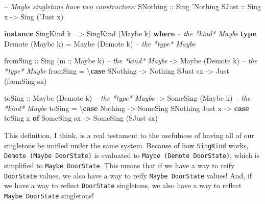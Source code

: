 \documentclass[]{article}
\newenvironment{Shaded}{}{}
\newcommand{\CharTok}[1]{\textcolor[rgb]{0.25,0.44,0.63}{#1}}
\newcommand{\CommentTok}[1]{\textcolor[rgb]{0.38,0.63,0.69}{\textit{#1}}}
\newcommand{\DataTypeTok}[1]{\textcolor[rgb]{0.56,0.13,0.00}{#1}}
\newcommand{\FunctionTok}[1]{\textcolor[rgb]{0.02,0.16,0.49}{#1}}
\newcommand{\KeywordTok}[1]{\textcolor[rgb]{0.00,0.44,0.13}{\textbf{#1}}}
\newcommand{\NormalTok}[1]{#1}
\newcommand{\OtherTok}[1]{\textcolor[rgb]{0.00,0.44,0.13}{#1}}
\begin{document}
\begin{Shaded}
\begin{Highlighting}[]
\CommentTok{-- Maybe singletons have two constructors:}
\DataTypeTok{SNothing}\OtherTok{ ::} \DataTypeTok{Sing} \CharTok{'Nothing}
\DataTypeTok{SJust}\OtherTok{    ::} \DataTypeTok{Sing}\NormalTok{ x }\OtherTok{->} \DataTypeTok{Sing}\NormalTok{ (}\CharTok{'Just x)}

\KeywordTok{instance} \DataTypeTok{SingKind}\NormalTok{ k }\OtherTok{=>} \DataTypeTok{SingKind}\NormalTok{ (}\DataTypeTok{Maybe}\NormalTok{ k) }\KeywordTok{where}     \CommentTok{-- the *kind* Maybe}
    \KeywordTok{type} \DataTypeTok{Demote}\NormalTok{ (}\DataTypeTok{Maybe}\NormalTok{ k) }\FunctionTok{=} \DataTypeTok{Maybe}\NormalTok{ (}\DataTypeTok{Demote}\NormalTok{ k)        }\CommentTok{-- the *type* Maybe}

\NormalTok{    fromSing}
\OtherTok{        ::} \DataTypeTok{Sing}\NormalTok{ (}\OtherTok{m ::} \DataTypeTok{Maybe}\NormalTok{ k)        }\CommentTok{-- the *kind* Maybe}
        \OtherTok{->} \DataTypeTok{Maybe}\NormalTok{ (}\DataTypeTok{Demote}\NormalTok{ k)           }\CommentTok{-- the *type* Maybe}
\NormalTok{    fromSing }\FunctionTok{=}\NormalTok{ \textbackslash{}}\KeywordTok{case}
        \DataTypeTok{SNothing} \OtherTok{->} \DataTypeTok{Nothing}
        \DataTypeTok{SJust}\NormalTok{ sx }\OtherTok{->} \DataTypeTok{Just}\NormalTok{ (fromSing sx)}

\NormalTok{    toSing}
\OtherTok{        ::} \DataTypeTok{Maybe}\NormalTok{ (}\DataTypeTok{Demote}\NormalTok{ k)             }\CommentTok{-- the *type* Maybe}
        \OtherTok{->} \DataTypeTok{SomeSing}\NormalTok{ (}\DataTypeTok{Maybe}\NormalTok{ k)           }\CommentTok{-- the *kind* Maybe}
\NormalTok{    toSing }\FunctionTok{=}\NormalTok{ \textbackslash{}}\KeywordTok{case}
        \DataTypeTok{Nothing} \OtherTok{->} \DataTypeTok{SomeSing} \DataTypeTok{SNothing}
        \DataTypeTok{Just}\NormalTok{ x  }\OtherTok{->} \KeywordTok{case}\NormalTok{ toSing x }\KeywordTok{of}
          \DataTypeTok{SomeSing}\NormalTok{ sx }\OtherTok{->} \DataTypeTok{SomeSing}\NormalTok{ (}\DataTypeTok{SJust}\NormalTok{ sx)}
\end{Highlighting}
\end{Shaded}

This definition, I think, is a real testament to the usefulness of having all of
our singletons be unified under the same system. Because of how
\texttt{SingKind} works, \texttt{Demote\ (Maybe\ DoorState)} is evaluated to
\texttt{Maybe\ (Demote\ DoorState)}, which is simplified to
\texttt{Maybe\ DoorState}. This means that if we have a way to reify
\texttt{DoorState} values, we also have a way to reify \texttt{Maybe\ DoorState}
values! And, if we have a way to reflect \texttt{DoorState} singletons, we also
have a way to reflect \texttt{Maybe\ DoorState} singletons!
\end{document}
